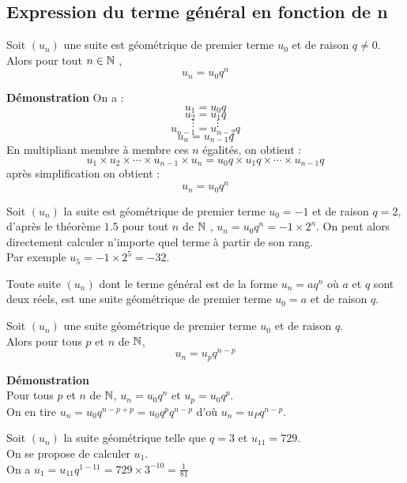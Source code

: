 \subsection*{Expression du terme général en fonction de n}
\begin{theorem} Soit $(u_{n})$ une  suite est géométrique de premier terme $u_{0} $ et de raison $ q\neq 0 $. Alors pour tout $ n\in\mathbb{N} $  , $$  u_{n}= u_{0}q^{n}$$
\end{theorem}
\textbf{Démonstration } On a :\[u_{1}=u_{0}q\]\[u_{2}=u_{1}q\]\[\vdots \qquad \vdots\] \[u_{n-1}=u_{n-2}q\]\[u_{n}=u_{n-1}q\]En multipliant membre à membre ces $ n $ égalités, on obtient :\[u_{1}\times u_{2} \times \cdots \times u_{n-1}\times u_{n}= u_{0}q \times u_{1}q  \times \cdots \times u_{n-1}q\] après  simplification on obtient :\[u_{n}= u_{0}q^{n}\] 
\begin{example} 

Soit $(u_{n})$ la  suite est géométrique  de premier terme $u_{0}=-1 $ et de raison $ q=2$, d'après le théorème $ 1.5 $ pour tout $n $ de $\mathbb{N} $ , $ u_{n}=u_{0}q^{n}=-1\times 2^{n} $. On peut alors directement calculer n'importe quel terme à partir de son rang. \\Par exemple $ u_{5}=-1\times2^{5}=-32 $.
\end{example}
\begin{remark}
Toute suite $(u_{n})$ dont le  terme général  est de la forme $ u_{n}=aq^{n} $  où $a $ et $ q $ sont deux réels, est une suite géométrique de premier terme $u_{0}= a $ et de raison $ q $. 
\end{remark}
 
 \begin{theorem} 
 Soit $(u_{n})$ une  suite  géométrique  de premier terme $u_{0} $ et de raison $ q $.\\   Alors pour tous $ p $ et  $ n$ de $\mathbb{N} $, $$u_{n}= u_{p}q^{n-p}$$
 \end{theorem}
 \textbf{Démonstration} \\ Pour tous $ p $ et  $ n$ de $\mathbb{N} $, $ u_{n}= u_{0}q^{n}$ et $ u_{p}= u_{0}q^{p}$.  \\On en tire \quad $ u_{n}=u_{0}q^{n-p+p}= u_{0}q^{p}q^{n-p}$ \quad d'où \quad $ u_{n}= u_{P}q^{n-p}$.
\begin{example}
 Soit  $(u_{n})$ la  suite  géométrique  telle que  $q=3 $ et $u_{11}=729 $.\\ On se propose de calculer  $u_{1} $. \\On a $ u_{1}=u_{11}q^{1-11}=729\times 3^{-10}=\frac{1}{81} $
 \end{example}

